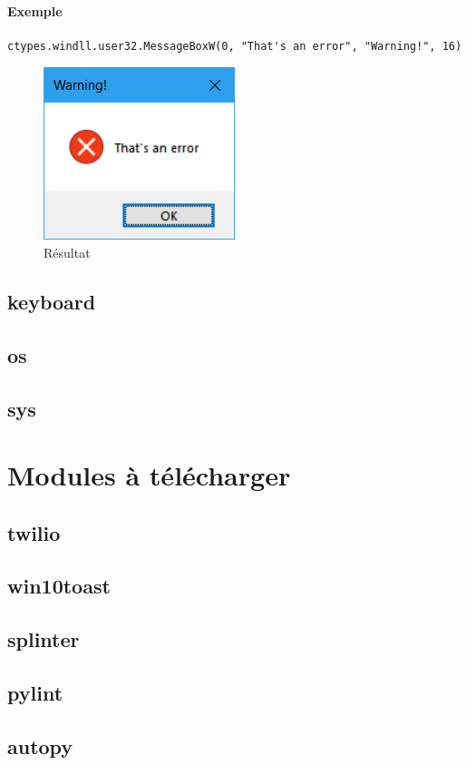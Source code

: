 \documentclass[a4paper, 10pt]{article}
\begin{document}
\paragraph{Exemple}
\begin{verbatim}
ctypes.windll.user32.MessageBoxW(0, "That's an error", "Warning!", 16)
\end{verbatim}
\begin{figure}[h]
\begin{center}
\includegraphics[scale=0.5]{errorwindow.png}
\caption*{Résultat}
\end{center}
\end{figure}

\subsection{keyboard}
\subsection{os}
\subsection{sys}

\section{Modules à télécharger}
\subsection{twilio}
\subsection{win10toast}
\subsection{splinter}
\subsection{pylint}

\subsection{autopy}


\printindex
\end{document}

